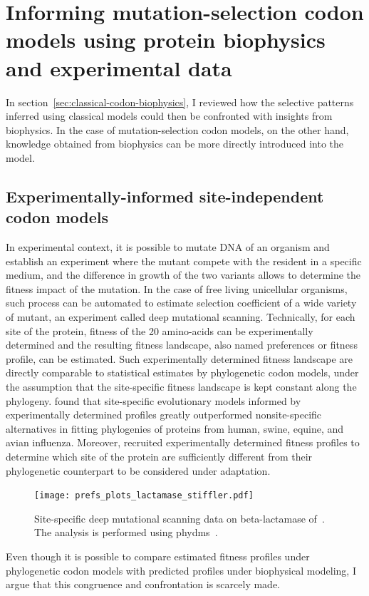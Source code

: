 \section{Informing mutation-selection codon models using protein biophysics and experimental data}
\label{sec:mechanistic-codon-biophysics}

In section~\ref{sec:classical-codon-biophysics}, I reviewed how the selective patterns inferred using classical models could then be confronted with insights from biophysics.
In the case of mutation-selection codon models, on the other hand, knowledge obtained from biophysics can be more directly introduced into the model.

\subsection{Experimentally-informed site-independent codon models}

In experimental context, it is possible to mutate DNA of an organism and establish an experiment where the mutant compete with the resident in a specific medium, and the difference in growth of the two variants allows to determine the fitness impact of the mutation.
In the case of free living unicellular organisms, such process can be automated to estimate selection coefficient of a wide variety of mutant, an experiment called deep mutational scanning.
Technically, for each site of the protein, fitness of the 20 amino-acids can be experimentally determined and the resulting fitness landscape, also named preferences or fitness profile, can be estimated.
Such experimentally determined fitness landscape are directly comparable to statistical estimates by phylogenetic codon models, under the assumption that the site-specific fitness landscape is kept constant along the phylogeny.
\citet{Doud2015} found that site-specific evolutionary models informed by experimentally determined profiles greatly outperformed nonsite-specific alternatives in fitting phylogenies of proteins from human, swine, equine, and avian influenza. 
Moreover, \citet{Bloom2017} recruited experimentally determined fitness profiles to determine which site of the protein are sufficiently different from their phylogenetic counterpart to be considered under adaptation.

\begin{figure}[H]
    \centering
    \texttt{[image: prefs\_plots\_lactamase\_stiffler.pdf]}
    \caption[Deep mutational scanning profile]{
    Site-specific deep mutational scanning data on beta-lactamase of~\citep{Stiffler2015}.
    The analysis is performed using phydms~\citep{Hilton2017}.}
    \label{fig:intro-deep-mut-profile}
\end{figure}
Even though it is possible to compare estimated fitness profiles under phylogenetic codon models with predicted profiles under biophysical modeling, I argue that this congruence and confrontation is scarcely made.

